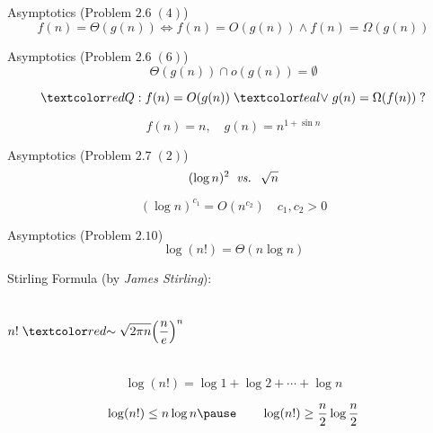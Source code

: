 \begin{frame}{}
  \begin{exampleblock}{Asymptotics (Problem $2.6\; (4)$)}
    \[
      f(n) = \Theta(g(n)) \iff f(n) = O(g(n)) \land f(n) = \Omega(g(n))
    \]
  \end{exampleblock}


  \pause
  \vspace{0.50cm}
  \begin{exampleblock}{Asymptotics (Problem $2.6\; (6)$)}
    \[
      \Theta(g(n)) \cap o(g(n)) = \emptyset
    \]
  \end{exampleblock}

  \pause
  \vspace{0.30cm}
  \[
    \red{Q:}\; f(n) = O(g(n)) \;\teal{\lor}\; g(n) = \Omega(f(n)) \;?
  \]

  \pause
  \[
    f(n) = n, \quad g(n) = n^{1 + \sin n}
  \]
\end{frame}

\begin{frame}{}
  \begin{exampleblock}{Asymptotics (Problem $2.7\; (2)$)}
    \[
      (\log n)^{2} \;\;\text{\it vs. }\; \sqrt{n}
    \]
  \end{exampleblock}

  \pause
  \[
    (\log n)^{c_1} = O(n^{c_2}) \quad c_1, c_2 > 0
  \]
\end{frame}

\begin{frame}{}
  \begin{exampleblock}{Asymptotics (Problem $2.10$)}
    \[
      \log(n!) = \Theta(n \log n)
    \]
  \end{exampleblock}

  \pause
  \vspace{0.30cm}
  \begin{alertblock}{Stirling Formula (by {\it James Stirling}):}
    \begin{columns}
	\[
	  n! \;\red{\sim}\; \sqrt{2 \pi n} \Big(\frac{n}{e}\Big)^{n}
	\]
    \end{columns}
  \end{alertblock}

  \pause
  \vspace{0.30cm}
  \[
    \log (n!) = \log 1 + \log 2 + \cdots + \log n
  \]

  \pause
  \[
    \log (n!) \le n \log n \pause \qquad \log (n!) \ge \frac{n}{2} \log \frac{n}{2}
  \]
\end{frame}

